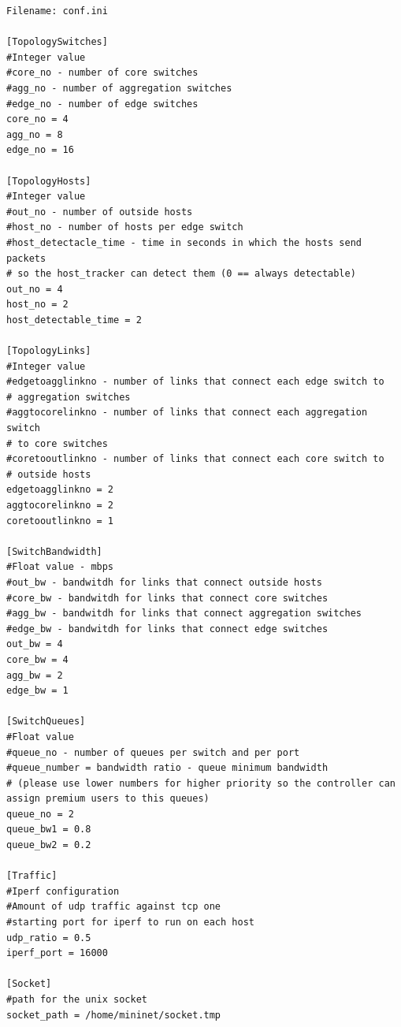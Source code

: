 \documentclass[12pt,english,oneside]{book}
\begin{document}
\begin{verbatim}
Filename: conf.ini

[TopologySwitches]
#Integer value
#core_no - number of core switches
#agg_no - number of aggregation switches
#edge_no - number of edge switches
core_no = 4
agg_no = 8
edge_no = 16

[TopologyHosts]
#Integer value
#out_no - number of outside hosts
#host_no - number of hosts per edge switch
#host_detectacle_time - time in seconds in which the hosts send packets 
# so the host_tracker can detect them (0 == always detectable)
out_no = 4
host_no = 2
host_detectable_time = 2

[TopologyLinks]
#Integer value
#edgetoagglinkno - number of links that connect each edge switch to 
# aggregation switches
#aggtocorelinkno - number of links that connect each aggregation switch 
# to core switches
#coretooutlinkno - number of links that connect each core switch to 
# outside hosts
edgetoagglinkno = 2
aggtocorelinkno = 2
coretooutlinkno = 1

[SwitchBandwidth]
#Float value - mbps
#out_bw - bandwitdh for links that connect outside hosts
#core_bw - bandwitdh for links that connect core switches
#agg_bw - bandwitdh for links that connect aggregation switches
#edge_bw - bandwitdh for links that connect edge switches
out_bw = 4
core_bw = 4
agg_bw = 2
edge_bw = 1

[SwitchQueues]
#Float value
#queue_no - number of queues per switch and per port
#queue_number = bandwidth ratio - queue minimum bandwidth 
# (please use lower numbers for higher priority so the controller can assign premium users to this queues)  
queue_no = 2
queue_bw1 = 0.8
queue_bw2 = 0.2

[Traffic]
#Iperf configuration
#Amount of udp traffic against tcp one
#starting port for iperf to run on each host
udp_ratio = 0.5
iperf_port = 16000

[Socket]
#path for the unix socket
socket_path = /home/mininet/socket.tmp

\end{verbatim}

\cleardoublepage


\cleardoublepage



\nocite{*}
\end{document}
